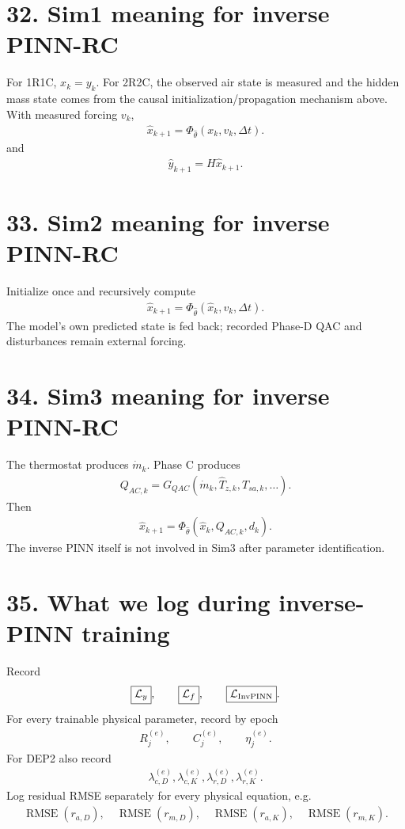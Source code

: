 \documentclass[11pt]{article}
\begin{document}
\section*{32. Sim1 meaning for inverse PINN-RC}
For 1R1C, \(x_k=y_k\). For 2R2C, the observed air state is measured and the hidden mass state comes from the causal initialization/propagation mechanism above. With measured forcing \(v_k\),
\begin{align}
\boxed{\widehat x_{k+1}=\Phi_{\widehat\theta}\left(x_k,v_k,\Delta t\right).}
\tag{P2.130}
\end{align}
and
\begin{align}
\boxed{\widehat y_{k+1}=H\widehat x_{k+1}.}
\tag{P2.131}
\end{align}

\section*{33. Sim2 meaning for inverse PINN-RC}
Initialize once and recursively compute
\begin{align}
\boxed{\widehat x_{k+1}=\Phi_{\widehat\theta}\left(\widehat x_k,v_k,\Delta t\right).}
\tag{P2.132}
\end{align}
The model's own predicted state is fed back; recorded Phase-D QAC and disturbances remain external forcing.

\section*{34. Sim3 meaning for inverse PINN-RC}
The thermostat produces \(\dot m_k\). Phase C produces
\begin{align}
\boxed{Q_{AC,k}=G_{QAC}\left(\dot m_k,\widehat T_{z,k},T_{sa,k},\ldots\right).}
\tag{P2.133}
\end{align}
Then
\begin{align}
\boxed{\widehat x_{k+1}=\Phi_{\widehat\theta}\left(\widehat x_k,Q_{AC,k},d_k\right).}
\tag{P2.134}
\end{align}
The inverse PINN itself is not involved in Sim3 after parameter identification.

\section*{35. What we log during inverse-PINN training}
Record
\begin{align}
\boxed{\mathcal L_y},\qquad \boxed{\mathcal L_f},\qquad \boxed{\mathcal L_{\rm InvPINN}}.
\end{align}
For every trainable physical parameter, record by epoch
\begin{align}
R_j^{(e)},\qquad C_j^{(e)},\qquad \eta_j^{(e)}.
\end{align}
For DEP2 also record
\begin{align}
\lambda_{c,D}^{(e)},\lambda_{c,K}^{(e)},\lambda_{r,D}^{(e)},\lambda_{r,K}^{(e)}.
\end{align}
Log residual RMSE separately for every physical equation, e.g.
\begin{align}
\operatorname{RMSE}(r_{a,D}),\quad \operatorname{RMSE}(r_{m,D}),\quad \operatorname{RMSE}(r_{a,K}),\quad \operatorname{RMSE}(r_{m,K}).
\end{align}
\end{document}
